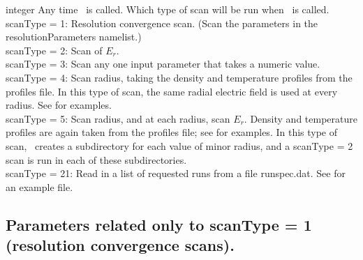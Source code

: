 \myhrule

{integer}
{Any time \sfincsScan~is called.}
{Which type of scan will be run when \sfincsScan~is called. \\

{\ttfamily scanType} = 1:  Resolution convergence scan. (Scan the parameters in the resolutionParameters namelist.)\\

{\ttfamily scanType} = 2:  Scan of $E_r$.\\

{\ttfamily scanType} = 3:  Scan any one input parameter that takes a numeric value.\\

{\ttfamily scanType} = 4:  Scan radius, taking the density and temperature profiles from the {\ttfamily profiles} file.
In this type of scan, the same radial electric field is used at every radius.
See  for examples.\\

{\ttfamily scanType} = 5:  Scan radius, and at each radius, scan $E_r$.  Density and temperature profiles are again
 taken from the {\ttfamily profiles} file; see  for examples.
In this type of scan, \sfincsScan~creates a subdirectory for each value of minor radius, and a
{\ttfamily scanType} = 2 scan is run in each of these subdirectories.
\\

{\ttfamily scanType} = 21: Read in a list of requested runs from a file {\ttfamily runspec.dat}. See  for an example file.
}



\subsection{Parameters related only to {\ttfamily scanType} = 1 (resolution convergence scans).}


